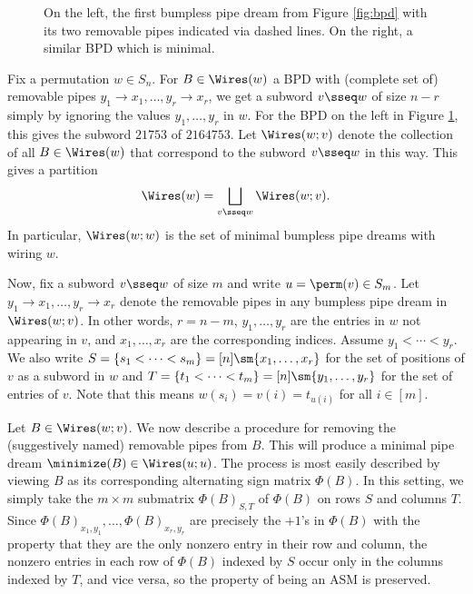\begin{figure}
    \centering
    \caption{On the left, the first bumpless pipe dream from Figure \ref{fig:bpd} with its two removable pipes indicated via dashed lines.
    On the right, a similar BPD which is minimal.}
    \label{fig:min_bpd}
\end{figure}

Fix a permutation $w\in S_n$.
For $B\in \Wires(w)$ a BPD with (complete set of) removable pipes $y_1\to x_1,\dots,y_r\to x_r$, we get a subword $v\sseq w$ of size $n-r$ simply by ignoring the values $y_1,\dots,y_r$ in $w$.
For the BPD on the left in Figure \ref{fig:min_bpd}, this gives the subword $21753$ of $2164753$.
Let $\Wires(w;v)$ denote the collection of all $B\in \Wires(w)$ that correspond to the subword $v\sseq w$ in this way.
This gives a partition \[
    \Wires(w) = \bigsqcup_{v\sseq w} \Wires(w;v).
\]
In particular, $\Wires(w;w)$ is the set of minimal bumpless pipe dreams with wiring $w$.

Now, fix a subword $v\sseq w$ of size $m$ and write $u = \perm(v) \in S_m$.
Let $y_1\to x_1,\dots,y_r\to x_r$ denote the removable pipes in any bumpless pipe dream in $\Wires(w;v)$.
In other words, $r = n-m$, $y_1,\dots,y_r$ are the entries in $w$ not appearing in $v$, and $x_1,\dots,x_r$ are the corresponding indices.
Assume $y_1< \cdots< y_r$.
We also write $S = \{s_1<\cdots<s_m\} = [n]\sm \{x_1,\dots,x_r\}$ for the set of positions of $v$ as a subword in $w$ and $T = \{t_1<\cdots<t_m\} = [n]\sm \{y_1,\dots,y_r\}$ for the set of entries of $v$.
Note that this means $w(s_i) = v(i) = t_{u(i)}$ for all $i\in[m]$.

Let $B\in \Wires(w;v)$.
We now describe a procedure for removing the (suggestively named) removable pipes from $B$.
This will produce a minimal pipe dream $\minimize(B)\in \Wires(u;u)$.
The process is most easily described by viewing $B$ as its corresponding alternating sign matrix $\Phi(B)$.
In this setting, we simply take the $m\times m$ submatrix $\Phi(B)_{S,T}$ of $\Phi(B)$ on rows $S$ and columns $T$.
Since $\Phi(B)_{x_1,y_1},\dots,\Phi(B)_{x_r,y_r}$ are precisely the $+1$'s in $\Phi(B)$ with the property that they are the only nonzero entry in their row and column, the nonzero entries in each row of $\Phi(B)$ indexed by $S$ occur only in the columns indexed by $T$, and vice versa, so the property of being an ASM is preserved.

